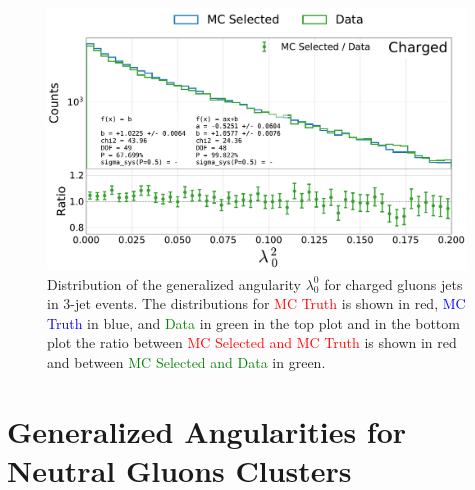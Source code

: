 \begin{figure}[h!]
  \centerfloat
  \includegraphics[width=0.99\textwidth, trim=0 0 0 0, clip, page=5]{figures/quarks/generalized_angularities_cha-down_sample=1.00-ML_vars=vertex-selection=b-ejet_min=4-n_iter_RS_lgb=99-n_iter_RS_xgb=9-cdot_cut=0.90-version=19.pdf}
  \caption[Generalized Angularities for Charged Gluons Jets: $\lambda_0^0$]
          {Distribution of the generalized angularity $\lambda_0^0$ for charged gluons jets in 3-jet events. The distributions for \textcolor{red}{MC Truth} is shown in red, \textcolor{blue}{MC Truth} in blue, and \textcolor{green}{Data} in green in the top plot and in the bottom plot the ratio between \textcolor{red}{MC Selected and MC Truth} is shown in red and between \textcolor{green}{MC Selected and Data} in green. }
  \label{fig:q:generalized_angularities_cha_lambda_0_0}
\end{figure}
\clearpage

\FloatBarrier
\section{Generalized Angularities for Neutral Gluons Clusters}

